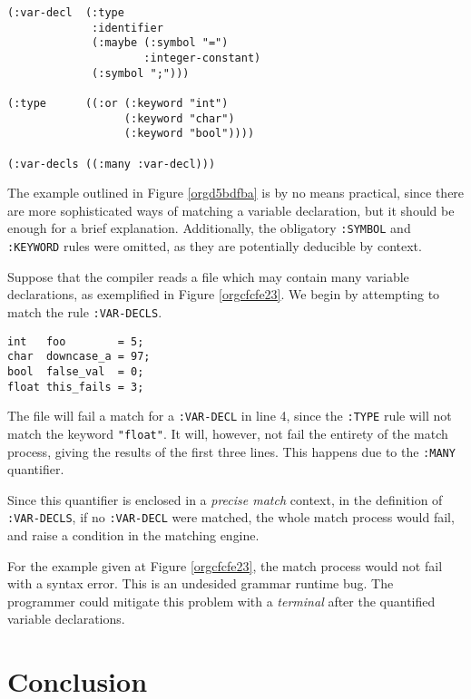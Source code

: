 \documentclass[a4paper,11pt,oneside]{article}
\begin{document}
\begin{verbatim}
(:var-decl  (:type
             :identifier
             (:maybe (:symbol "=")
                     :integer-constant)
             (:symbol ";")))

(:type      ((:or (:keyword "int")
                  (:keyword "char")
                  (:keyword "bool"))))

(:var-decls ((:many :var-decl)))
\end{verbatim}
\hfill \break

The example outlined in Figure \ref{orgd5bdfba} is by no means
practical, since there are more sophisticated ways of matching a
variable declaration, but it should be enough for a brief
explanation. Additionally, the obligatory \texttt{:SYMBOL} and \texttt{:KEYWORD} rules
were omitted, as they are potentially deducible by context.

Suppose that the compiler reads a file which may contain many variable
declarations, as exemplified in Figure \ref{orgcfcfe23}. We begin by
attempting to match the rule \texttt{:VAR-DECLS}.

\begin{verbatim}
int   foo        = 5;
char  downcase_a = 97;
bool  false_val  = 0;
float this_fails = 3;
\end{verbatim}
\hfill \break

The file will fail a match for a \texttt{:VAR-DECL} in line 4, since the \texttt{:TYPE}
rule will not match the keyword \texttt{"float"}. It will, however, not fail
the entirety of the match process, giving the results of the first
three lines. This happens due to the \texttt{:MANY} quantifier.

Since this quantifier is enclosed in a \emph{precise match} context, in the
definition of \texttt{:VAR-DECLS}, if no \texttt{:VAR-DECL} were matched, the whole
match process would fail, and raise a condition in the matching
engine.

For the example given at Figure \ref{orgcfcfe23}, the match process would
not fail with a syntax error. This is an undesided grammar runtime
bug. The programmer could mitigate this problem with a \emph{terminal} after
the quantified variable declarations.

\section{Conclusion}
\label{sec:org619ac7c}
\end{document}
